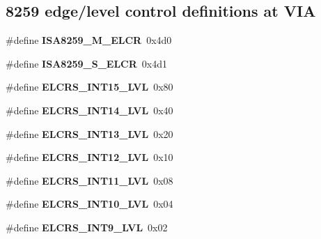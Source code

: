 \subsection*{8259 edge/level control definitions at V\+IA}
\begin{DoxyCompactItemize}
\item 
\mbox{\label{group__mips__i8259__irq_ga72aa7829091fd9f7689f62226208edcd}} 
\#define {\bfseries I\+S\+A8259\+\_\+\+M\+\_\+\+E\+L\+CR}~0x4d0
\item 
\mbox{\label{group__mips__i8259__irq_ga6cfaa5e9fa3e55d8d2b80757af4d1882}} 
\#define {\bfseries I\+S\+A8259\+\_\+\+S\+\_\+\+E\+L\+CR}~0x4d1
\item 
\mbox{\label{group__mips__i8259__irq_ga532f1d0d698be7cbbfd2aa766461e28a}} 
\#define {\bfseries E\+L\+C\+R\+S\+\_\+\+I\+N\+T15\+\_\+\+L\+VL}~0x80
\item 
\mbox{\label{group__mips__i8259__irq_gaa4b81b4d824e3d408c9097819bfc2b35}} 
\#define {\bfseries E\+L\+C\+R\+S\+\_\+\+I\+N\+T14\+\_\+\+L\+VL}~0x40
\item 
\mbox{\label{group__mips__i8259__irq_ga7ea167196938cd8033dc7d542c2773c4}} 
\#define {\bfseries E\+L\+C\+R\+S\+\_\+\+I\+N\+T13\+\_\+\+L\+VL}~0x20
\item 
\mbox{\label{group__mips__i8259__irq_gacda1d6ecec8dc4bcf5060f02af17d82e}} 
\#define {\bfseries E\+L\+C\+R\+S\+\_\+\+I\+N\+T12\+\_\+\+L\+VL}~0x10
\item 
\mbox{\label{group__mips__i8259__irq_ga0bc1f57c959aba080862afd3383ed917}} 
\#define {\bfseries E\+L\+C\+R\+S\+\_\+\+I\+N\+T11\+\_\+\+L\+VL}~0x08
\item 
\mbox{\label{group__mips__i8259__irq_gaf7844ce635caedb9e9d8099b4b8d94b3}} 
\#define {\bfseries E\+L\+C\+R\+S\+\_\+\+I\+N\+T10\+\_\+\+L\+VL}~0x04
\item 
\mbox{\label{group__mips__i8259__irq_ga1001a3ffe21bca79b3e6ed42d64ae74e}} 
\#define {\bfseries E\+L\+C\+R\+S\+\_\+\+I\+N\+T9\+\_\+\+L\+VL}~0x02

\end{DoxyCompactItemize}
